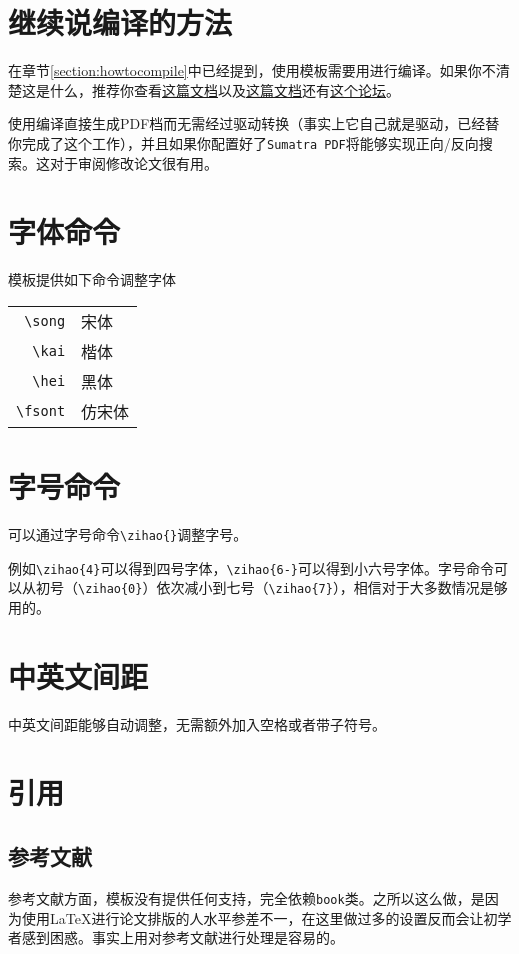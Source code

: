 \section{继续说编译的方法}
在章节\ref{section:howtocompile}中已经提到，使用模板需要用\XeLaTeX{}进行编译。如果你不清楚这是什么，推荐你查看\href{ http://blog.renren.com/blog/bp/Q74DZitxxv}{这篇文档}以及\href{http://blog.renren.com/blog/bp/Q7LjRQLBcl}{这篇文档}还有\href{http://bbs.ctex.org/forum.php}{这个论坛}。

使用\XeLaTeX{}编译直接生成PDF档而无需经过驱动转换（事实上它自己就是驱动，已经替你完成了这个工作），并且如果你配置好了\texttt{Sumatra PDF}将能够实现正向/反向搜索。这对于审阅修改论文很有用。
\section{字体命令}
模板提供如下命令调整字体
\begin{center}
\begin{tabular}
{rl}
\toprule
\verb|\song|& 宋体\\
\verb|\kai|& 楷体\\
\verb|\hei|& 黑体\\
\verb|\fsont|& 仿宋体\\
\bottomrule
\end{tabular}
\end{center}
\section{字号命令}
可以通过字号命令\verb|\zihao{}|调整字号。

例如\verb|\zihao{4}|可以得到四号字体，\verb|\zihao{6-}|可以得到小六号字体。字号命令可以从初号（\verb|\zihao{0}|）依次减小到七号（\verb|\zihao{7}|），相信对于大多数情况是够用的。
\section{中英文间距}
中英文间距能够自动调整，无需额外加入空格或者带子符号。
\section{引用}
\subsection{参考文献}
参考文献方面，模板没有提供任何支持，完全依赖\texttt{book}类。之所以这么做，是因为使用\LaTeX{}进行论文排版的人水平参差不一，在这里做过多的设置反而会让初学者感到困惑。事实上用\BibTeX{}对参考文献进行处理是容易的。
